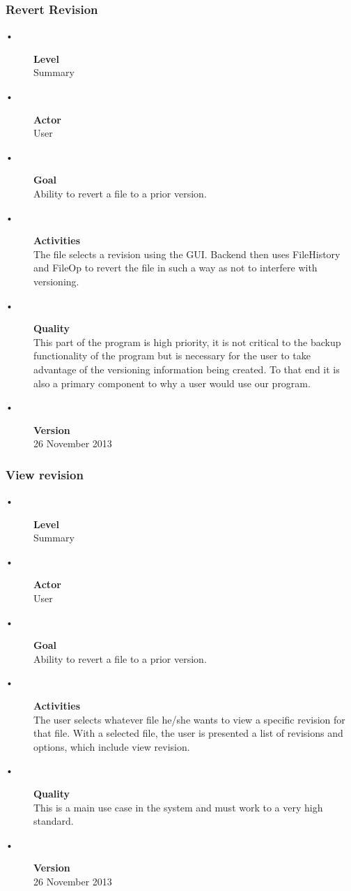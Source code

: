 \documentclass[12pt,a4paper]{article}
\begin{document}
\subsubsection{Revert Revision} 
\begin{description}
	\item[•] \textbf{Level}  \hfill \\
	Summary
	\item[•] \textbf{Actor} \hfill \\
	User
	\item[•] \textbf{Goal} \hfill \\
	Ability to revert a file to a prior version.
	\item[•] \textbf{Activities} \hfill \\
	The file selects a revision using the GUI. Backend then uses FileHistory and FileOp to revert the file in such a way as not to interfere with versioning. 
	\item[•] \textbf{Quality} \hfill \\
	This part of the program is high priority, it is not critical to the backup functionality of the program but is necessary for the user to take advantage of the versioning information being created.
	 To that end it is also a primary component to why a user would use our program. 
	\item[•] \textbf{Version} \hfill \\
	26 November 2013	
\end{description}
\subsubsection{View revision}
\begin{description}
	\item[•] \textbf{Level}  \hfill \\
	Summary
	\item[•] \textbf{Actor} \hfill \\
	User
	\item[•] \textbf{Goal} \hfill \\
	Ability to revert a file to a prior version.
	\item[•] \textbf{Activities} \hfill \\
	The user selects whatever file he/she wants to view a specific revision for that file. With a selected file, the user is presented a list of revisions and options, which include view revision. 
	\item[•] \textbf{Quality} \hfill \\
	This is a main use case in the system and must work to a very high standard. 
	\item[•] \textbf{Version} \hfill \\
	26 November 2013	
\end{description}
\end{document}
